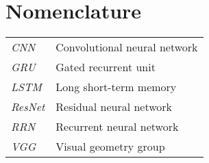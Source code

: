\newpage
\makeatletter
\let\mcnewpage=\newpage
\newcommand{\TrickSupertabularIntoMulticols}{%
  \renewcommand\newpage{%
    \if@firstcolumn
      \hrule width\linewidth height0pt
      \columnbreak
    \else
      \mcnewpage
    \fi
  }%
}
\makeatother
\chapter{Nomenclature}
\begin{changemargin}{-0.5cm}{0cm}
\begin{multicols}{2}
\TrickSupertabularIntoMulticols
\begin{supertabular}{>{\em}ll}
CNN & Convolutional neural network \\
GRU & Gated recurrent unit \\
LSTM & Long short-term memory \\
ResNet & Residual neural network \\
RRN & Recurrent neural network \\
VGG & Visual geometry group \\
\end{supertabular}
\end{multicols}
\end{changemargin}